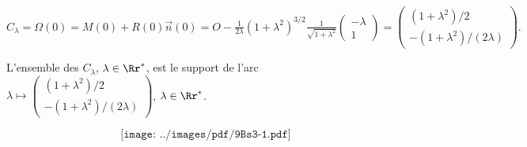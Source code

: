 {{\begin{center}
$C_\lambda=\Omega(0)=M(0)+R(0)\overrightarrow{n}(0)=O-\frac{1}{2\lambda}(1+\lambda^2)^{3/2}\frac{1}{\sqrt{1+\lambda^2}}\left(
\begin{array}{c}
-\lambda\\
1
\end{array}
\right)=\left(
\begin{array}{c}
(1+\lambda^2)/2\\
-(1+\lambda^2)/(2\lambda)
\end{array}
\right).$
\end{center}
L'ensemble des $C_\lambda$, $\lambda\in\Rr^*$, est le support de l'arc $\lambda\mapsto\left(
\begin{array}{c}
(1+\lambda^2)/2\\
-(1+\lambda^2)/(2\lambda)
\end{array}
\right)$, $\lambda\in\Rr^*$.

$$\texttt{[image: ../images/pdf/9Bs3-1.pdf]}$$
}
}
